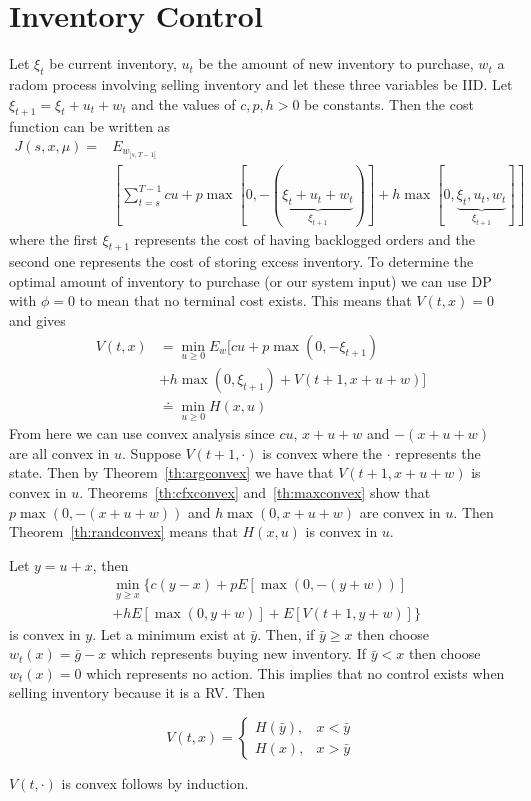 \section{Inventory Control}
Let $\xi_t$ be current inventory, $u_t$ be the amount of new inventory to purchase, $w_t$ a radom process involving selling inventory and let these three variables be IID\@.
Let $\xi_{t+1} = \xi_t+u_t+w_t$ and the values of $c,p,h>0$ be constants.
Then the cost function can be written as
\begin{align*}
J(s,x,\mu) =& E_{w_{]s,T-1[}} \\%
&\left[\sum_{t=s}^{T-1}cu+p\max[0,-(\underbrace{\xi_t+u_t+w_t}_{\xi_{t+1}})] + h\max[0,\underbrace{\xi_t,u_t,w_t}_{\xi_{t+1}}] \right]
\end{align*}
where the first $\xi_{t+1}$ represents the cost of having backlogged orders and the second one represents the cost of storing excess inventory.
To determine the optimal amount of inventory to purchase (or our system input) we can use DP with $\phi=0$ to mean that no terminal cost exists.
This means that $V(t,x)=0$ and gives
\begin{align*}
V(t,x) &= \min_{u\geq 0}E_w[cu+p\max(0,-\xi_{t+1}) \\
&+ h\max(0,\xi_{t+1}) + V(t+1,x+u+w)] \\
&\doteq \min_{u\geq 0}H(x,u)
\end{align*}
From here we can use convex analysis since $cu$, $x+u+w$ and $-(x+u+w)$ are all convex in $u$.
Suppose $V(t+1,\cdot)$ is convex where the $\cdot$ represents the state.
Then by Theorem~\ref{th:argconvex} we have that $V(t+1,x+u+w)$ is convex in $u$.
Theorems~\ref{th:cfxconvex} and~\ref{th:maxconvex} show that $p\max(0,-(x+u+w))$ and $h\max(0,x+u+w)$ are convex in $u$.
Then Theorem~\ref{th:randconvex} means that $H(x,u)$ is convex in $u$.

Let $y=u+x$, then
\begin{align*}
&\min_{y\geq x}\{ c(y-x)+pE[\max(0,-(y+w))] \\
&+ hE[\max(0,y+w)] + E[V(t+1,y+w)]\}
\end{align*}
is convex in $y$.
Let a minimum exist at $\bar{y}$.
Then, if $\bar{y}\geq x$ then choose $w_t(x) = \bar{g}-x$ which represents buying new inventory.
If $\bar{y}<x$ then choose $w_t(x)=0$ which represents no action.
This implies that no control exists when selling inventory because it is a RV\@.
Then

\begin{equation*}
V(t,x) = \begin{cases} H(\bar{y}), & x<\bar{y} \\ H(x), & x>\bar{y} \end{cases}
\end{equation*}

$V(t,\cdot)$ is convex follows by induction.%
